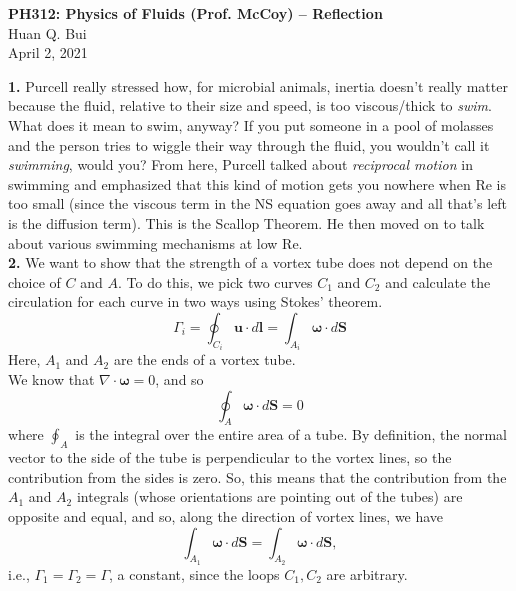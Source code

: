 \documentclass[11pt]{article}
\begin{document}
\begin{center}
{\large \bf PH312: Physics of Fluids (Prof. McCoy) -- Reflection}\\
{ Huan Q. Bui}\\
April 2, 2021
\end{center}



\noindent \textbf{1.} Purcell really stressed how, for microbial animals, inertia doesn't really matter because the fluid, relative to their size and speed, is too viscous/thick to \textit{swim}. What does it mean to swim, anyway? If you put someone in a pool of molasses and the person tries to wiggle their way through the fluid, you wouldn't call it \textit{swimming}, would you? From here, Purcell talked about \textit{reciprocal motion} in swimming and emphasized that this kind of motion gets you nowhere when Re is too small (since the viscous term in the NS equation goes away and all that's left is the diffusion term). This is the Scallop Theorem. He then moved on to talk about various swimming mechanisms at low Re. \\



\noindent \textbf{2.} We want to show that the strength of a vortex tube does not depend on the choice of $C$ and $A$. To do this, we pick two curves $C_1$ and $C_2$ and calculate the circulation for each curve in two ways using Stokes' theorem. 
\begin{equation*}
\Gamma_i = \oint_{C_i} \mathbf{u}\cdot d\mathbf{l} = \int_{A_i} \boldsymbol{\omega} \cdot d \mathbf{S}
\end{equation*}
Here, $A_1$ and $A_2$ are the ends of a vortex tube. \\


We know that $\nabla \cdot  \boldsymbol{\omega} = 0$, and so 
\begin{equation*}
\oint_A \boldsymbol{\omega} \cdot d\mathbf{S} = 0
\end{equation*}
where $\oint_A$ is the integral over the entire area of a tube.  By definition, the normal vector to the side of the tube is perpendicular to the vortex lines, so the contribution from the sides is zero. So, this means that the contribution from the $A_1$ and $A_2$ integrals (whose orientations are pointing out of the tubes) are opposite and equal, and so, along the direction of vortex lines, we have
\begin{equation*}
\int_{A_1} \boldsymbol{\omega} \cdot d \mathbf{S}
=
\int_{A_2} \boldsymbol{\omega} \cdot d \mathbf{S},
\end{equation*} 
i.e., $\Gamma_1 = \Gamma_2 = \Gamma$, a constant, since the loops $C_1, C_2$ are arbitrary. \\
\end{document}
